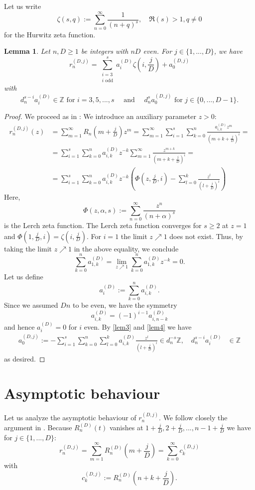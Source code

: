 \documentclass[11pt]{amsart}
\theoremstyle{plain}
\newtheorem{lem}[thm]{Lemma}
\theoremstyle{remark}
\theoremstyle{definition}
\newcommand{\ZZ}{\mathbb{Z}}
\begin{document}
Let us write
\[
	\zeta(s,q):=\sum_{n=0}^\infty \frac{1}{(n+q)^s},\quad \Re(s)>1,q\neq 0
\]
for the Hurwitz zeta function.
\begin{lem}\label{lem5}
Let $n,D\geq1$ be integers with $nD$ even. For $j\in\{1,...,D\}$, we have	
\[
	r^{(D,j)}_n=\sum_{\substack{i=3 \\ i \text{ odd}}}^s a^{(D)}_i\zeta\left(i,\frac{j}{D}\right)+a^{(D,j)}_0
\]
with 
\[
	d_n^{s-i}a^{(D)}_i\in \ZZ \text{ for } i=3,5,...,s\quad \text{ and }\quad  d_n^s a_0^{(D,j)} \text{ for } j\in\{0,...,D-1\}.
\]
\end{lem}
\begin{proof}
	We proceed as in \cite[Lemma 3]{zudilin}: We introduce an auxiliary parameter $z>0$:
	\begin{align*}
		r_n^{(D,j)}(z)&=\sum_{m=1}^\infty R_n\left(m+\frac{j}{D}\right)z^m=\sum_{m=1}^\infty \sum_{i=1}^s\sum_{k=0}^n \frac{a^{(D)}_{i,k}z^m}{(m+k+\frac{j}{D})^i}=\\
		&= \sum_{i=1}^s\sum_{k=0}^na^{(D)}_{i,k}z^{-k}\sum_{m=1}^\infty \frac{z^{m+k}}{(m+k+\frac{j}{D})^i}=\\
		&= \sum_{i=1}^s\sum_{k=0}^na^{(D)}_{i,k}z^{-k}\left(\Phi(z,\frac{j}{D},i)-\sum_{l=0}^k \frac{z^{l}}{(l+\frac{j}{D})^i}  \right)
	\end{align*}
	Here,
	\[
		\Phi(z,\alpha,s):=\sum_{n=0}^\infty \frac{z^n}{(n+\alpha)^s}
	\]
	is the Lerch zeta function. The Lerch zeta function converges for $s\geq 2$ at $z=1$ and $\Phi(1,\frac{j}{D},i)=\zeta(i,\frac{j}{D})$. For $i=1$ the limit $z\nearrow 1$ does not exist. Thus, by taking the limit $z\nearrow 1$ in the above equality, we conclude
	\[
		\sum_{k=0}^na^{(D)}_{1,k}=\lim_{z\nearrow 1} \sum_{k=0}^na^{(D)}_{1,k}z^{-k}=0.
	\]
	Let us define
	\[
		a^{(D)}_i:=\sum_{k=0}^n a_{i,k}^{(D)}.
	\]
	Since we assumed $Dn$ to be even,  we have the symmetry
	\[
		a_{i,k}^{(D)}=(-1)^{i-1}a_{i,n-k}^{(D)}
	\]
	and hence  $a^{(D)}_i=0$ for $i$ even. By \cref{lem3}  and \cref{lem4} we have 
	\begin{align*}
		a_0^{(D,j)}:=-\sum_{i=1}^s\sum_{k=0}^n\sum_{l=0}^k a^{(D)}_{i,k} \frac{z^{l}}{(l+\frac{j}{D})^i}  \in d_n^{-s}\ZZ,\quad d_n^{s-i}a^{(D)}_i&\in\ZZ
	\end{align*}
	as desired.
\end{proof}

\section{Asymptotic behaviour}
Let us analyze the asymptotic behaviour of $r_n^{(D,j)}$. We follow closely the argument in \cite{zudilin}.
Because $R_n^{(D)}(t)$ vanishes at $1+\frac{j}{D},2+\frac{j}{D},...,n-1+\frac{j}{D}$ we have for $j\in\{1,...,D\}$:
\[
	r^{(D,j)}_n=\sum_{m=1}^\infty R^{(D)}_n(m+\frac{j}{D})=\sum_{k=0}^\infty c_k^{(D,j)}
\]
with
\[
	c_k^{(D,j)}:=R^{(D)}_n\left(n+k+\frac{j}{D}\right).
\]
\end{document}
